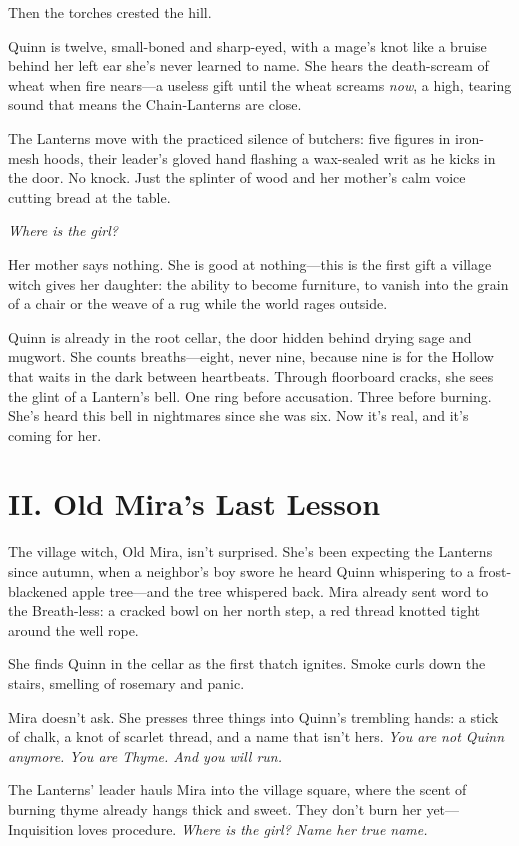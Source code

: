 \documentclass[11pt]{book}
\begin{document}
Then the torches crested the hill.

Quinn is twelve, small-boned and sharp-eyed, with a mage's knot like a bruise behind her left ear she's never learned to name. She hears the death-scream of wheat when fire nears---a useless gift until the wheat screams \textit{now}, a high, tearing sound that means the Chain-Lanterns are close.

The Lanterns move with the practiced silence of butchers: five figures in iron-mesh hoods, their leader's gloved hand flashing a wax-sealed writ as he kicks in the door. No knock. Just the splinter of wood and her mother's calm voice cutting bread at the table.

\emph{Where is the girl?}

Her mother says nothing. She is good at nothing---this is the first gift a village witch gives her daughter: the ability to become furniture, to vanish into the grain of a chair or the weave of a rug while the world rages outside.

Quinn is already in the root cellar, the door hidden behind drying sage and mugwort. She counts breaths---eight, never nine, because nine is for the Hollow that waits in the dark between heartbeats. Through floorboard cracks, she sees the glint of a Lantern's bell. One ring before accusation. Three before burning. She's heard this bell in nightmares since she was six. Now it's real, and it's coming for her.

\section*{II. Old Mira's Last Lesson}
The village witch, Old Mira, isn't surprised. She's been expecting the Lanterns since autumn, when a neighbor's boy swore he heard Quinn whispering to a frost-blackened apple tree---and the tree whispered back. Mira already sent word to the Breath-less: a cracked bowl on her north step, a red thread knotted tight around the well rope.

She finds Quinn in the cellar as the first thatch ignites. Smoke curls down the stairs, smelling of rosemary and panic.

Mira doesn't ask. She presses three things into Quinn's trembling hands: a stick of chalk, a knot of scarlet thread, and a name that isn't hers. \textit{You are not Quinn anymore. You are Thyme. And you will run.}

The Lanterns' leader hauls Mira into the village square, where the scent of burning thyme already hangs thick and sweet. They don't burn her yet---Inquisition loves procedure. \textit{Where is the girl? Name her true name.}
\end{document}
